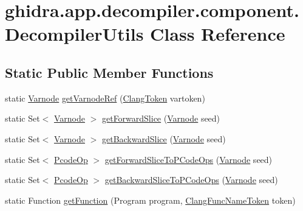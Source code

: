 \hypertarget{classghidra_1_1app_1_1decompiler_1_1component_1_1_decompiler_utils}{}\section{ghidra.\+app.\+decompiler.\+component.\+Decompiler\+Utils Class Reference}
\label{classghidra_1_1app_1_1decompiler_1_1component_1_1_decompiler_utils}
\subsection*{Static Public Member Functions}
\begin{DoxyCompactItemize}
\item 
static \mbox{\hyperlink{class_varnode}{Varnode}} \mbox{\hyperlink{classghidra_1_1app_1_1decompiler_1_1component_1_1_decompiler_utils_a54a63bbb674ce85f95916cb263e7ada3}{get\+Varnode\+Ref}} (\mbox{\hyperlink{classghidra_1_1app_1_1decompiler_1_1_clang_token}{Clang\+Token}} vartoken)
\item 
static Set$<$ \mbox{\hyperlink{class_varnode}{Varnode}} $>$ \mbox{\hyperlink{classghidra_1_1app_1_1decompiler_1_1component_1_1_decompiler_utils_a95f384c1cd6328bcad6555a80a886790}{get\+Forward\+Slice}} (\mbox{\hyperlink{class_varnode}{Varnode}} seed)
\item 
static Set$<$ \mbox{\hyperlink{class_varnode}{Varnode}} $>$ \mbox{\hyperlink{classghidra_1_1app_1_1decompiler_1_1component_1_1_decompiler_utils_a1307674bdd9f48bfb0919950d59be19b}{get\+Backward\+Slice}} (\mbox{\hyperlink{class_varnode}{Varnode}} seed)
\item 
static Set$<$ \mbox{\hyperlink{class_pcode_op}{Pcode\+Op}} $>$ \mbox{\hyperlink{classghidra_1_1app_1_1decompiler_1_1component_1_1_decompiler_utils_a8d0973ddd8181bb7afe7a696f91bd116}{get\+Forward\+Slice\+To\+P\+Code\+Ops}} (\mbox{\hyperlink{class_varnode}{Varnode}} seed)
\item 
static Set$<$ \mbox{\hyperlink{class_pcode_op}{Pcode\+Op}} $>$ \mbox{\hyperlink{classghidra_1_1app_1_1decompiler_1_1component_1_1_decompiler_utils_a0ab1ddf9b7ca7bf0e66ef9b367c6a17f}{get\+Backward\+Slice\+To\+P\+Code\+Ops}} (\mbox{\hyperlink{class_varnode}{Varnode}} seed)
\item 
static Function \mbox{\hyperlink{classghidra_1_1app_1_1decompiler_1_1component_1_1_decompiler_utils_a57a704c884b7f65374e0390f5e101084}{get\+Function}} (Program program, \mbox{\hyperlink{classghidra_1_1app_1_1decompiler_1_1_clang_func_name_token}{Clang\+Func\+Name\+Token}} token)

\end{DoxyCompactItemize}
